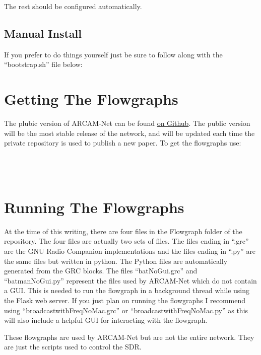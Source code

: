 
The rest should be configured automatically.

\subsection{Manual Install}

If you prefer to do things yourself just be sure to follow along with the ``bootstrap.sh'' file below:



\section{Getting The Flowgraphs}

The plubic version of ARCAM-Net can be found \href{https://github.com/jmccormack200/ARCAM-Net-Public.git}{on Github}. The public version will be the most stable release of the network, and will be updated each time the private repository is used to publish a new paper. To get the flowgraphs use: \\

 \\
 \\
 \\

\section{Running The Flowgraphs}

At the time of this writing, there are four files in the Flowgraph folder of the repository. The four files are actually two sets of files. The files ending in ``.grc'' are the GNU Radio Companion implementations and the files ending in ``.py'' are the same files but written in python. The Python files are automatically generated from the GRC blocks. The files ``batNoGui.grc'' and ``batmanNoGui.py'' represent the files used by ARCAM-Net which do not contain a GUI. This is needed to run the flowgraph in a background thread while using the Flask web server. If you just plan on running the flowgraphs I recommend using ``broadcastwithFreqNoMac.grc'' or ``broadcastwithFreqNoMac.py'' as this will also include a helpful GUI for interacting with the flowgraph.

These flowgraphs are used by ARCAM-Net but are not the entire network. They are just the scripts used to control the SDR. 

